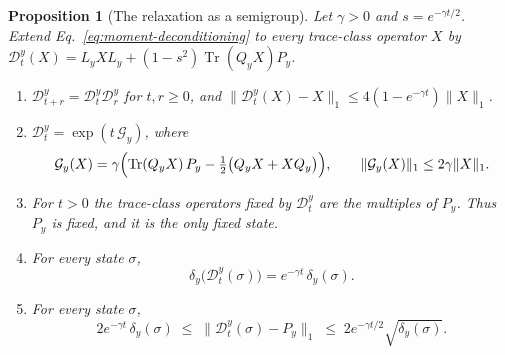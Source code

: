 \documentclass[11pt]{article}
\newtheorem{proposition}{Proposition}[section]
\theoremstyle{definition}
\DeclareMathOperator{\Tr}{Tr}
\begin{document}
\begin{proposition}[The relaxation as a semigroup]
\label{prop:relaxation-semigroup}
Let $\gamma>0$ and $s=e^{-\gamma t/2}$. Extend Eq.~\eqref{eq:moment-deconditioning} to every trace-class operator $X$ by $\mathcal D_t^y(X)=L_yXL_y+(1-s^2)\Tr(Q_yX)P_y$.
\begin{enumerate}
\item[(a)] $\mathcal D_{t+r}^y=\mathcal D_t^y\mathcal D_r^y$ for $t,r\ge0$, and $\|\mathcal D_t^y(X)-X\|_1\le4(1-e^{-\gamma t})\|X\|_1$.
\item[(b)] $\mathcal D_t^y=\exp(t\,\mathcal G_y)$, where
\begin{equation}
 \mathcal G_y(X)=\gamma\Bigl(\Tr(Q_yX)\,P_y-\tfrac12\bigl(Q_yX+XQ_y\bigr)\Bigr),
 \qquad \|\mathcal G_y(X)\|_1\le2\gamma\|X\|_1 .
 \label{eq:relaxation-generator}
\end{equation}
\item[(c)] For $t>0$ the trace-class operators fixed by $\mathcal D_t^y$ are the multiples of $P_y$. Thus $P_y$ is fixed, and it is the only fixed state.
\item[(d)] For every state $\sigma$,
\begin{equation}
 \delta_y\bigl(\mathcal D_t^y(\sigma)\bigr)=e^{-\gamma t}\,\delta_y(\sigma).
 \label{eq:relaxation-decay}
\end{equation}
\item[(e)] For every state $\sigma$,
\begin{equation}
 2e^{-\gamma t}\,\delta_y(\sigma)\;\le\;\bigl\|\mathcal D_t^y(\sigma)-P_y\bigr\|_1\;\le\;2e^{-\gamma t/2}\sqrt{\delta_y(\sigma)} .
 \label{eq:relaxation-distance}
\end{equation}
\end{enumerate}
\end{proposition}
\end{document}
